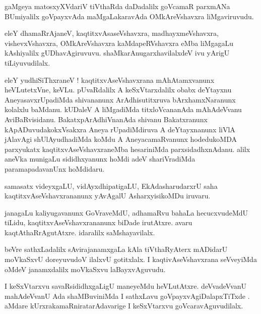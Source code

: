 \documentclass{article}
\begin{document}
\begin{mn}
gaMgeya matosxyXVdariV tiVthaRda daDadalilx goVcamaR parxmANa BUmiyalilx goVpayxvAda 
maMgaLakaravAda OMkAreVshavxra liMgaviruvudu.
\end{mn}

\begin{mn}
eleY dhamaRrAjaneV, kaqtitxvAsaseVshavxra, madhayxmeVshavxra, vishevxVshavxra, OMkAreVshavxra
kaMdapeRVshavxra eMba liMgagaLu kAshiyalilx gUDhavAgiruvuvu. shaMkarAnugarxhavilalxdeV ivu yArigU 
tiLiyuvudilalx.
\end{mn}

\begin{mn}
eleY yudhiSiThxraneV ! kaqtitxvAseVshavxrana mAhAtamxvanunx heVLutetxVne, keVLu. pUvaRdalilx A 
keSxVtarxdalilx obabx deYtayxnu AneyasavxrUpadiMda shivananunx ArAdhisutitxruva bArxhamxNaranunx 
kolalxlu baMdanu. kUDaleV A liMgadiMda titxloVcananAda  mAhAdeVvanu AviBaRvisidanu. 
BakatxpArAdhiVnanAda shivanu Bakatxranunx kApADuvudakokxVsakxra Aneya rUpadiMdiruva A deYtayxnanunx
liVlA jAlavAgi shUlAyudhadiMda koMdu A AneyacamaRvanunx hodedukoMDA parxyukatx 
kaqtitxvAseVshavxraneMba hesariniMda parxsidadhxnAdanu. alilx aneVka munigaLu sididhxyanunx hoMdi 
adeV shariVradiMda paramapadavanUnx hoMdidaru.
\end{mn}

\begin{mn}
samasatx videyxgaLU, vidAyxdhipatigaLU, EkAdasharudarxrU saha kaqtitxvAseVshavxrananunx yAvAgalU 
AsharxyisikoMDu iruvaru.
\end{mn}

\begin{mn}
janagaLu kaliyugavanunx GoVraveMdU, adhamaRvu bahaLa hecucxvudeMdU tiLidu, 
kaqtitxvAseVshavxrananunx biDade irutAtxre. avaru kaqtAthaRrAgutAtxre. idaralilx saMshayavilalx.
\end{mn}

\begin{mn}
beVre sathxLadalilx sAvirajanamxgaLa kAla tiVthaRyAterx mADidarU moVkaSxvU doreyuvudoV ilalxvU
gotitxlalx. I kaqtivAseVshavxrana seVveyiMda oMdeV janamxdalilx moVkaSxvu laBayxvAguvudu.
\end{mn}

\begin{mn}
I keSxVtarxvu savaRsididhxgaLigU maneyeMdu heVLutAtxre. deVvadeVvanU mahAdeVvanU Ada shaMBuviniMda 
I sathxLavu goVpayxvAgiDalapxTiTxde . aMdare kUrxrakamaRniratarAdavarige I keSxVtarxvu 
goVcaravAguvudilalx.
\end{mn}
\end{document}
